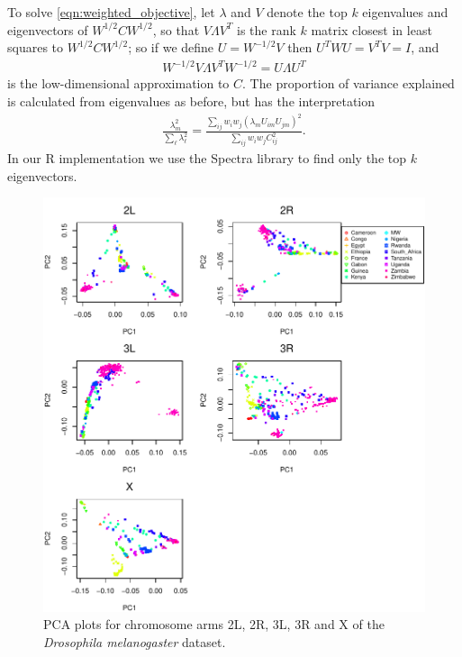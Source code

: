 \documentclass[11pt, oneside]{article}   	%
\begin{document}
To solve \eqref{eqn:weighted_objective},
let $\lambda$ and $V$ denote the top $k$ eigenvalues and eigenvectors of $W^{1/2} C W^{1/2}$,
so that $V \Lambda V^T$ is the rank $k$ matrix closest in least squares to $W^{1/2} C W^{1/2}$;
so if we define $U = W^{-1/2} V$
then $U^T W U = V^T V = I$,
and 
\begin{align*}
    W^{-1/2} V \Lambda V^T W^{-1/2} 
    =
    U \Lambda U^T
\end{align*}
is the low-dimensional approximation to $C$.
The proportion of variance explained is calculated from eigenvalues as before,
but has the interpretation
\begin{align*}
    \frac{ \lambda_m^2 }{ \sum_\ell \lambda_\ell^2 } 
    = 
    \frac{ \sum_{ij} w_i w_j ( \lambda_m U_{im} U_{jm} )^2 }{ \sum_{ij} w_i w_j C_{ij}^2 } .
\end{align*}
In our R implementation we use the Spectra library \citep{qiu2016rspectra}
to find only the top $k$ eigenvectors.

\begin{figure}
    \begin{center}
       \includegraphics[width=1\textwidth]{FigS_pca_plots_allchr_drosophila}
    \end{center}
    \caption{
        PCA plots for chromosome arms 2L, 2R, 3L, 3R and X of the \textit{Drosophila melanogaster} dataset.
        \label{sfig:pca_drosophila_allchr}
    }
\end{figure}
\end{document}
